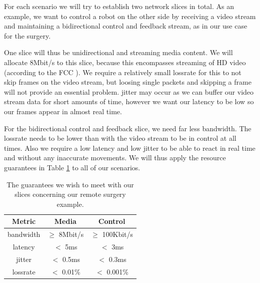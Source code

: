 

For each scenario we will try to establish two network slices in total. As an example, we want to control a robot on the other side by receiving a video stream and maintaining a bidirectional control and feedback stream, as in our use case for the surgery.

One slice will thus be unidirectional and streaming media content. We will allocate 8Mbit/s to this slice, because this encompasses streaming of HD video (according to the FCC \cite{fcc}). We require a relatively small \gls{lossrate} for this to not skip frames on the video stream, but loosing single packets and skipping a frame will not provide an essential problem. \Gls{jitter} may occur as we can buffer our video stream data for short amounts of time, however we want our \gls{latency} to be low so our frames appear in almost real time.

For the bidirectional control and feedback slice, we need far less \gls{bandwidth}. The \gls{lossrate} needs to be lower than with the video stream to be in control at all times. Also we require a low \gls{latency} and low \gls{jitter} to be able to react in real time and without any inaccurate movements. We will thus apply the resource guarantees in Table \ref{table:slices} to all of our scenarios.

\begin{table}[ht]
    \centering
    \begin{tabular}{ |c|c|c| }
        \hline
        \textbf{Metric} & \textbf{Media} & \textbf{Control} \\
        \hline
        \Gls{bandwidth} & $\geq$ 8Mbit/s & $\geq$ 100Kbit/s \\
        \Gls{latency}   & $<$ 5ms        & $<$ 3ms          \\
        \Gls{jitter}    & $<$ 0.5ms      & $<$ 0.3ms        \\
        \Gls{lossrate}  & $<$ 0.01\%     & $<$ 0.001\%      \\
        \hline
    \end{tabular}
    \caption[Slice \acrshort{qos} guarantees in our remote surgery example]{The guarantees we wish to meet with our slices concerning our remote surgery example.}
    \label{table:slices}
\end{table}

